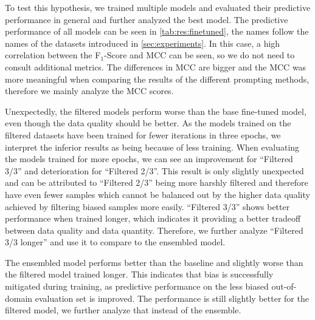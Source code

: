 To test this hypothesis, we trained multiple models and evaluated their predictive performance in general and further analyzed the best model. The predictive performance of all models can be seen in \autoref{tab:res:finetuned}, the names follow the names of the datasets introduced in \autoref{sec:experiments}. In this case, a high correlation between the F$_1$-Score and \ac{MCC} can be seen, so we do not need to consult additional metrics. The differences in \ac{MCC} are bigger and the \ac{MCC} was more meaningful when comparing the results of the different prompting methods, therefore we mainly analyze the \ac{MCC} scores.

Unexpectedly, the filtered models perform worse than the base fine-tuned model, even though the data quality should be better. As the models trained on the filtered datasets have been trained for fewer iterations in three epochs, we interpret the inferior results as being because of less training. When evaluating the models trained for more epochs, we can see an improvement for \enquote{Filtered 3/3} and deterioration for \enquote{Filtered 2/3}. This result is only slightly unexpected and can be attributed to \enquote{Filtered 2/3} being more harshly filtered and therefore have even fewer samples which cannot be balanced out by the higher data quality achieved by filtering biased samples more easily. \enquote{Filtered 3/3} shows better performance when trained longer, which indicates it providing a better tradeoff between data quality and data quantity. Therefore, we further analyze \enquote{Filtered 3/3 longer} and use it to compare to the ensembled model.

The ensembled model performs better than the baseline and slightly worse than the filtered model trained longer. This indicates that bias is successfully mitigated during training, as predictive performance on the less biased out-of-domain evaluation set is improved. The performance is still slightly better for the filtered model, we further analyze that instead of the ensemble.

